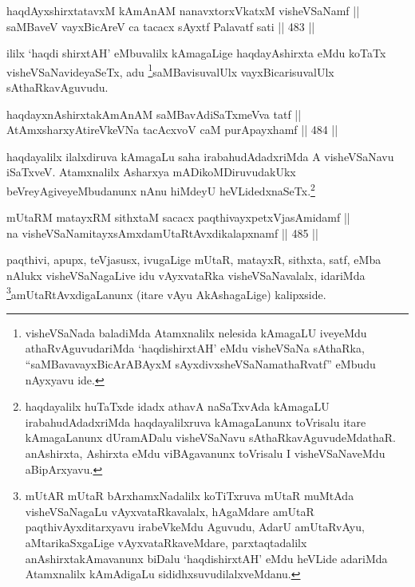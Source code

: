 
\begin{shl}
haqdAyxshirxtatavxM kAmAnAM nanavxtorxVkatxM visheVSaNamf || \\
saMBaveV vayxBicAreV ca tacacx sAyxtf Palavatf sati \hfill || 483 ||  
\end{shl}

\begin{artha}		
ililx `haqdi shirxtAH' eMbuvalilx kAmagaLige haqdayAshirxta eMdu
koTaTx visheVSaNavideyaSeTx, adu \footnote{visheVSaNada baladiMda
Atamxnalilx nelesida kAmagaLU iveyeMdu athaRvAguvudariMda
`haqdishirxtAH' eMdu visheVSaNa sAthaRka, ``saMBavavayxBicArABAyxM sAyxdivxsheVSaNamathaRvatf'' eMbudu nAyxyavu ide.}saMBavisuvalUlx vayxBicarisuvalUlx sAthaRkavAguvudu.
\end{artha}

\begin{shl}
haqdayxnAshirxtakAmAnAM saMBavAdiSaTxmeVva tatf || \\
AtAmxsharxyAtireVkeVNa tacAcxvoV caM purA\s payxhamf \hfill || 484 ||  
\end{shl}

\begin{artha}
haqdayalilx ilalxdiruva kAmagaLu saha irabahudAdadxriMda A
visheVSaNavu iSaTxveV. Atamxnalilx Asharxya mADikoMDiruvudakUkx
beVreyAgiveyeMbudanunx nAnu hiMdeyU heVLidedxnaSeTx.\footnote{haqdayalilx huTaTxde idadx athavA naSaTxvAda kAmagaLU
irabahudAdadxriMda haqdayalilxruva kAmagaLanunx toVrisalu itare
kAmagaLanunx dUramADalu visheVSaNavu sAthaRkavAguvudeMdathaR.
anAshirxta, Ashirxta eMdu viBAgavanunx toVrisalu I visheVSaNaveMdu aBipArxyavu.}
\end{artha}


\begin{shl}
mUtaRM matayxRM sithxtaM sacacx paqthivayxpetxVjasAmidamf || \\
na visheVSaNamitayxsAmxdamUtaRtAvxdikalapxnamf \hfill || 485 ||  
\end{shl}

\begin{artha}
paqthivi, apupx, teVjasusx, ivugaLige mUtaR, matayxR, sithxta, satf,
eMba nAlukx visheVSaNagaLive idu vAyxvataRka visheVSaNavalalx,
idariMda \footnote{mUtAR mUtaR bArxhamxNadalilx koTiTxruva mUtaR
muMtAda visheVSaNagaLu vAyxvataRkavalalx, hAgaMdare amUtaR
paqthivAyxditarxyavu irabeVkeMdu Aguvudu, AdarU amUtaRvAyu,
aMtarikaSxgaLige vAyxvataRkaveMdare, parxtaqtadalilx
anAshirxtakAmavanunx biDalu `haqdishirxtAH' eMdu heVLide adariMda
Atamxnalilx kAmAdigaLu sididhxsuvudilalxveMdanu.}amUtaRtAvxdigaLanunx (itare vAyu AkAshagaLige)
kalipxside.
\end{artha}

